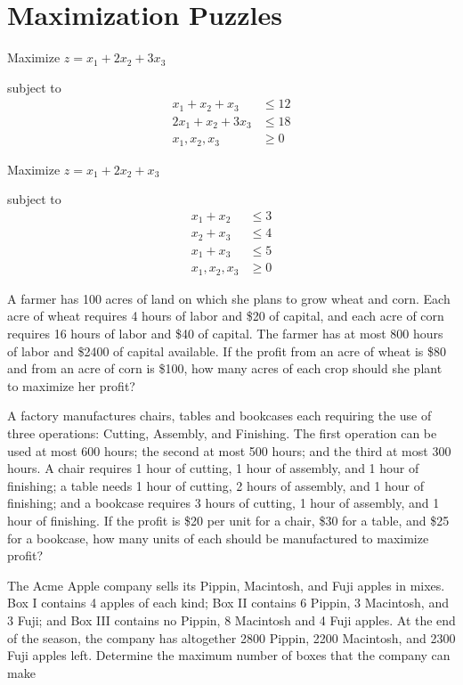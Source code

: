 \section{Maximization Puzzles}

\begin{puzzle}
    Maximize $z = x_1 + 2x_2 + 3x_3$

    subject to
    \begin{align*}
        x_1 + x_2 + x_3   & \leq 12 \\
        2x_1 + x_2 + 3x_3 & \leq 18 \\
        x_1, x_2, x_3     & \geq 0
    \end{align*}
\end{puzzle}

\begin{puzzle}
    Maximize $z = x_1 + 2x_2 + x_3$

    subject to
    \begin{align*}
        x_1 + x_2     & \leq 3 \\
        x_2 + x_3     & \leq 4 \\
        x_1 + x_3     & \leq 5 \\
        x_1, x_2, x_3 & \geq 0
    \end{align*}
\end{puzzle}

\begin{puzzle}
    A farmer has 100 acres of land on which she plans to grow wheat and corn. Each acre of wheat
    requires 4 hours of labor and \$20 of capital, and each acre of corn requires 16 hours of labor and
    \$40 of capital. The farmer has at most 800 hours of labor and \$2400 of capital available. If the
    profit from an acre of wheat is \$80 and from an acre of corn is \$100, how many acres of each crop
    should she plant to maximize her profit?
\end{puzzle}

\begin{puzzle}
    A factory manufactures chairs, tables and bookcases each requiring the use of three operations:
    Cutting, Assembly, and Finishing. The first operation can be used at most 600 hours; the second
    at most 500 hours; and the third at most 300 hours. A chair requires 1 hour of cutting, 1 hour of
    assembly, and 1 hour of finishing; a table needs 1 hour of cutting, 2 hours of assembly, and 1 hour
    of finishing; and a bookcase requires 3 hours of cutting, 1 hour of assembly, and 1 hour of finishing.
    If the profit is \$20 per unit for a chair, \$30 for a table, and \$25 for a bookcase, how many units of
    each should be manufactured to maximize profit?
\end{puzzle}

\begin{puzzle}
    The Acme Apple company sells its Pippin, Macintosh, and Fuji apples in mixes. Box I contains
    4 apples of each kind; Box II contains 6 Pippin, 3 Macintosh, and 3 Fuji; and Box III contains no
    Pippin, 8 Macintosh and 4 Fuji apples. At the end of the season, the company has altogether 2800
    Pippin, 2200 Macintosh, and 2300 Fuji apples left. Determine the maximum number of boxes that
    the company can make
\end{puzzle}
